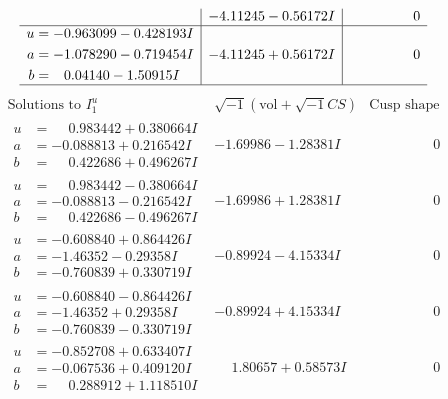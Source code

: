 \documentclass[1p]{elsarticle_modified}
\theoremstyle{definition}
\newcommand{\I}{\sqrt{-1}}
\begin{document}
$$\begin{array}{c|c|c}
 & -4.11245 - 0.56172 I & \phantom{-0.000000 } 0 \\ \hline\begin{aligned}
u &= -0.963099 - 0.428193 I \\
a &= -1.078290 - 0.719454 I \\
b &= \phantom{-}0.04140 - 1.50915 I\end{aligned}
 & -4.11245 + 0.56172 I & \phantom{-0.000000 } 0\\
 \hline 
 \end{array}$$\newpage$$\begin{array}{c|c|c}  
\text{Solutions to }I^u_{1}& \I (\text{vol} + \sqrt{-1}CS) & \text{Cusp shape}\\
 \hline 
\begin{aligned}
u &= \phantom{-}0.983442 + 0.380664 I \\
a &= -0.088813 + 0.216542 I \\
b &= \phantom{-}0.422686 + 0.496267 I\end{aligned}
 & -1.69986 - 1.28381 I & \phantom{-0.000000 } 0 \\ \hline\begin{aligned}
u &= \phantom{-}0.983442 - 0.380664 I \\
a &= -0.088813 - 0.216542 I \\
b &= \phantom{-}0.422686 - 0.496267 I\end{aligned}
 & -1.69986 + 1.28381 I & \phantom{-0.000000 } 0 \\ \hline\begin{aligned}
u &= -0.608840 + 0.864426 I \\
a &= -1.46352 - 0.29358 I \\
b &= -0.760839 + 0.330719 I\end{aligned}
 & -0.89924 - 4.15334 I & \phantom{-0.000000 } 0 \\ \hline\begin{aligned}
u &= -0.608840 - 0.864426 I \\
a &= -1.46352 + 0.29358 I \\
b &= -0.760839 - 0.330719 I\end{aligned}
 & -0.89924 + 4.15334 I & \phantom{-0.000000 } 0 \\ \hline\begin{aligned}
u &= -0.852708 + 0.633407 I \\
a &= -0.067536 + 0.409120 I \\
b &= \phantom{-}0.288912 + 1.118510 I\end{aligned}
 & \phantom{-}1.80657 + 0.58573 I & \phantom{-0.000000 } 0 \\ \hline\begin{aligned}

\end{aligned}
\end{array}$$
\end{document}

